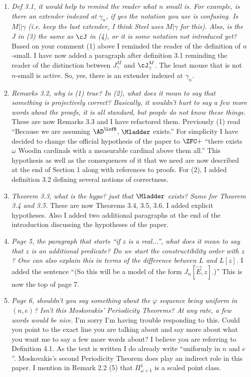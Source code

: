 \documentclass[oneside,12pt]{amsart}
\begin{document}
\begin{enumerate} [label=\arabic*)]
 \item  \emph{Def 3.1, it would help to remind the reader what $n$ small is. For example, is there an extender indexed at 
 $\gamma_n$, if yes the notation you use is confusing. Is $M\vert\vert \gamma$ (i.e. keep the last extender, I think Steel uses 
 $M\vert\gamma$ for this). Also, is the $J$ in (3) the same as $\cJ$ in (4), or it is some notation not introduced yet?} 
  Based on your comment (1) above I reminded the reader of the definition of $n$-small. I have now added a paragraph after definition 3.1 reminding the reader of the distinction between $J^M_{\gamma}$ and $\cJ^M_{\gamma}$. 
  The least mouse that is not $n$-small is active. So, yes, there is an extender indexed at $\gamma_n$.

  \item \emph{Remarks 3.2, why is (1) true? In (2), what does it mean to say that something is projectively correct? Basically, it wouldn’t hurt to say a few more words about the proofs, it is
all standard, but people do not know these things.} These are now Remarks 3.3 and I have refactored them. Previously (1) read ``Because we are assuming $\AD^{\LofR}$, $\Mladder$ exists.'' For simplicity I have decided to change the official hypothesis of the paper to $\ZFC + $ ``there exists $\omega$ Woodin cardinals with a measurable cardinal above them all.''
This hypothesis as well as the consequences of it that we need are now described at the end of Section 1 along with references
to proofs. For (2), I added definition 3.2 defining several notions of correctness.

\item \emph{Theorem 3.3, what is the hypo? just that $\Mladder$ exists? Same for Theorem 3.4 and 3.5.}
These are now Theorems 3.4, 3.5, 3.6. I added explicit hypotheses. Also I added two additional paragraphs at the end of the introduction discussing the hypotheses of the paper.

\item \emph{Page 5, the paragraph that starts ``if $z$ is a real...'', what does it mean to say that $z$ is an
additional predicate? Do we start the constructibility order with $z$? One can also explain
this in terms of the difference between $L$ and $L[z]$.}  I added the sentence 
``(So this will be a model of the form $J_{\alpha}[\vec{E},z]$.)'' This is now the top of page 7.

\item  \emph{Page 6, shouldn’t you say something about the $\varphi$ sequence being uniform in $(n,e)$? Isn’t this Moskovakis’ Periodicity Theorems? At any rate, a few words would be nice.} I’m sorry I’m having trouble responding to this. Could you point to the exact line you are talking about and say more about what you want me to say a few more words about? I believe you are
referring to Definition 4.1. As the text is written I do already write ``uniformly in $n$ and $e$''. Moskovakis’s  second Periodicity Theorem does play an indirect role in this paper. I mention in Remark 2.2 (5) that $\Pi^1_{\omega+1}$ is a scaled point class. 


\end{enumerate}
\end{document}
